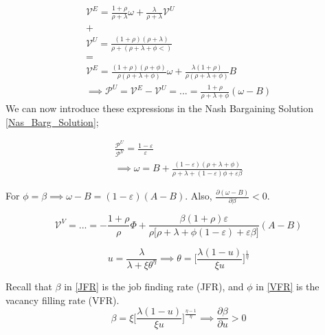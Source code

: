 \begin{equation*}
\begin{aligned}
    \mathcal{V}^{E}=\frac{1+\rho}{\rho+\lambda}\omega+\frac{\lambda}{\rho+\lambda}\mathcal{V}^{U} \\ 
    + \\
    \mathcal{V}^{U}=\frac{(1+\rho)(\rho+\lambda)}{\rho+(\rho+\lambda+\phi<)} \\
    = \\
    \mathcal{V}^{E}=\frac{(1+\rho)(\rho+\phi)}{\rho(\rho+\lambda+\phi)}\omega+ \frac{\lambda(1+\rho)}{\rho(\rho+\lambda+\phi)}B \\
    \implies \mathcal{P}^{U}=\mathcal{V}^{E}-\mathcal{V}^{U}=...=\frac{1+\rho}{\rho+\lambda+\phi}(\omega-B)
\end{aligned}
\end{equation*}
We can now introduce these expressions in the Nash Bargaining Solution \ref{Nas_Barg_Solution};

\begin{equation*}
\begin{aligned}
    \frac{\mathcal{P}^{U}}{\mathcal{P}^{V}}=\frac{1-\varepsilon}{\varepsilon} \\
    \implies \omega=B+\frac{(1-\varepsilon)(\rho+\lambda+\phi)}{\rho+\lambda+(1-\varepsilon)\phi+\varepsilon\beta}
\end{aligned}
\end{equation*}

For $\phi=\beta \implies \omega-B=(1-\varepsilon)(A-B)$. Also, $\frac{\partial(\omega-B)}{\partial\beta}<0$.

\begin{equation*}
    \mathcal{V}^{V}=...=-\frac{1+\rho}{\rho}\Phi+\frac{\beta(1+\rho)\varepsilon}{\rho \big[\rho+\lambda+\phi(1-\varepsilon)+\varepsilon\beta \big]}(A-B)
\end{equation*}

\begin{equation*}
    u=\frac{\lambda}{\lambda +\xi\theta^{\eta}} \implies \theta=\bigg[\frac{\lambda(1-u)}{\xi u} \bigg]^{\frac{1}{\eta}}
\end{equation*}

Recall that $\beta$ in \ref{JFR} is the job finding rate (JFR), and $\phi$ in \ref{VFR} is the vacancy filling rate (VFR). 
\begin{equation*}
    \beta=\xi \bigg[\frac{\lambda(1-u)}{\xi u} \bigg]^{\frac{\eta-1}{\eta}} \implies \frac{\partial\beta}{\partial u}>0
\end{equation*}


